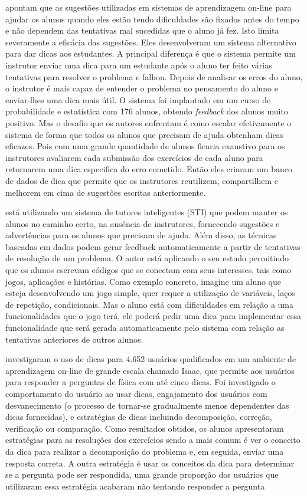  apontam que as sugestões utilizadas em sistemas de aprendizagem on-line para ajudar os alunos quando eles estão tendo dificuldades são fixados antes do tempo e não dependem das tentativas mal sucedidas que o aluno já fez. Isto limita severamente a eficácia das sugestões. Eles desenvolveram um sistema alternativo para dar dicas aos estudantes. A principal diferença é que o sistema permite um instrutor enviar uma dica para um estudante após o aluno ter feito várias tentativas para resolver o problema e falhou. Depois de analisar os erros do aluno, o instrutor é mais capaz de entender o problema no pensamento do aluno e enviar-lhes uma dica mais útil. O sistema foi implantado em um curso de probabilidade e estatística com 176 alunos, obtendo \textit{feedback} dos alunos muito positivo. Mas o desafio que os autores enfrentam é como escalar efetivamente o sistema de forma que todos os alunos que precisam de ajuda obtenham dicas eficazes. Pois com uma grande quantidade de alunos ficaria exaustivo para os instrutores avaliarem cada submissão dos exercícios de cada aluno para retornarem uma dica especifica do erro cometido. Então eles criaram um banco de dados de dica que permite que os instrutores reutilizem, compartilhem e melhorem em cima de sugestões escritas anteriormente.

 está utilizando um sistema de tutores inteligentes (STI) que podem manter os alunos no caminho certo, na ausência de instrutores, fornecendo sugestões e advertências para os alunos que precisam de ajuda. Além disso, as técnicas baseadas em dados podem gerar feedback automaticamente a partir de tentativas de resolução de um problema. O autor está aplicando o seu estudo permitindo que os alunos escrevam códigos que se conectam com seus interesses, tais como jogos, aplicações e histórias. Como exemplo concreto, imagine um aluno que esteja desenvolvendo um jogo simple, quer requer a utilização de variáveis, laços de repetição, condicionais. Mas o aluno está com dificuldades em relação a uma funcionalidades que o jogo terá, ele poderá pedir uma dica para implementar essa funcionalidade que será gerada automaticamente pelo sistema com relação as tentativas anteriores de outros alunos.

 investigaram  o uso de dicas para 4.652 usuários qualificados em um ambiente de aprendizagem on-line de grande escala chamado Isaac, que permite aos usuários para responder a perguntas de física com até cinco dicas. Foi investigado o comportamento do usuário ao usar dicas, engajamento dos usuários com desvanecimento (o processo de tornar-se gradualmente menos dependentes das dicas fornecidas), e estratégias de dicas incluindo decomposição, correção, verificação ou comparação. Como resultados obtidos, os alunos apresentaram estratégias para as resoluções dos exercícios sendo a mais comum é ver o conceito da dica para realizar a decomposição do problema e, em seguida, enviar uma resposta correta. A outra estratégia é usar os conceitos da dica para determinar se a pergunta pode ser respondida, uma grande proporção dos usuários que utilizaram essa estratégia acabaram não tentando responder a pergunta


